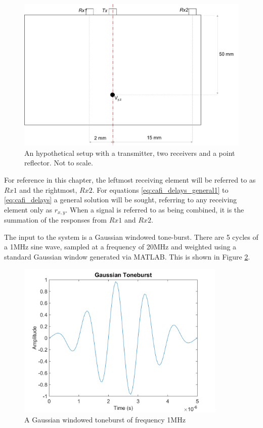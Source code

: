 \begin{figure}[htbp]
\centering
		\includegraphics[width=\textwidth]{Experiment3.png}
		\caption{An hypothetical setup with a transmitter, two receivers and a point reflector. Not to scale.}
		\label{fig:cafi_experiment}
\end{figure}

For reference in this chapter, the leftmost receiving element will be referred to as $Rx1$ and the rightmost, $Rx2$. For equations \ref{eq:cafi_delays_general1} to \ref{eq:cafi_delays} a general solution will be sought, referring to any receiving element only as $r_{x,y}$. When a signal is referred to as being combined, it is the summation of the responses from $Rx1$ and $Rx2$.

The input to the system is a Gaussian windowed tone-burst. There are 5 cycles of a 1MHz sine wave, sampled at a frequency of 20MHz and weighted using a standard Gaussian window generated via MATLAB. This is shown in Figure \ref{fig:cafi_toneburst}.

\begin{figure}[htb]
\centering
		\includegraphics[width=100mm]{InitialToneburst.png}
		\caption{A Gaussian windowed toneburst of frequency 1MHz}
		\label{fig:cafi_toneburst}
\end{figure}

